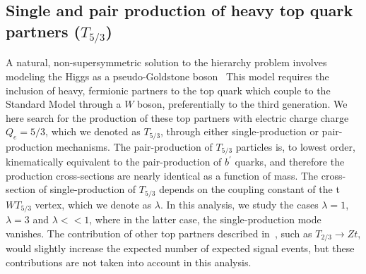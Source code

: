 
\subsection{Single and pair production of heavy top quark partners ($T_{5/3}$)}

A natural, non-supersymmetric solution to the hierarchy problem involves modeling the Higgs as a pseudo-Goldstone boson~\cite{Contino:2008cx}
This model requires the inclusion of heavy, fermionic partners to the top quark which couple to the Standard Model through a $W$ boson, preferentially to the third generation.
We here search for the production of these top partners with electric charge charge $Q_{e}=5/3$, which we denoted as $T_{5/3}$, through either single-production or pair-production mechanisms.
The pair-production of $T_{5/3}$ particles is, to lowest order, kinematically equivalent to the pair-production of $b^{\prime}$ quarks, and therefore the production cross-sections are nearly identical as a function of mass.
The cross-section of single-production of $T_{5/3}$ depends on the coupling constant of the t$WT_{5/3}$ vertex, which we denote as $\lambda$.
In this analysis, we study the cases $\lambda=1$, $\lambda=3$ and $\lambda << 1$, where in the latter case, the single-production mode vanishes.
The contribution of other top partners described in~\cite{Contino:2008cx}, such as $T_{2/3} \rightarrow Zt$, would slightly increase the expected number of expected signal events, but these contributions are not taken into account in this analysis. 

